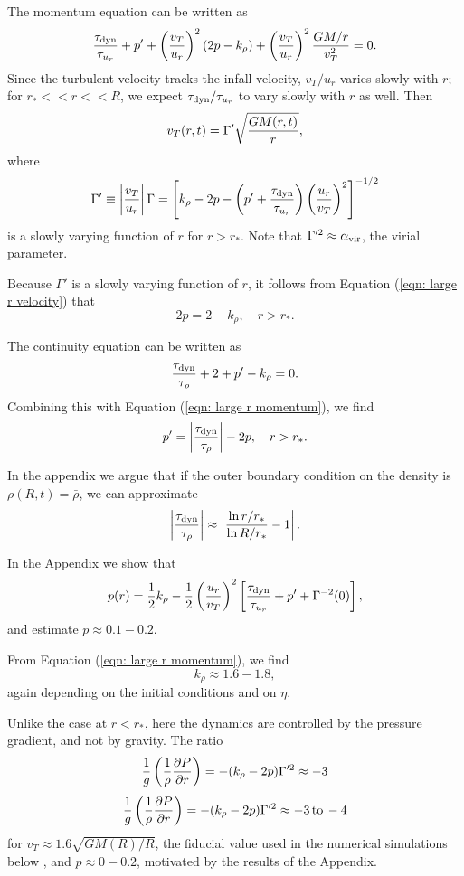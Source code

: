 \documentclass[iop,apj,numberedappendix]{emulateapj}
\newcommand       \phil[1]      {{\color{blue} #1}}
\newcommand       \be		{\begin{equation}}
\newcommand       \ee		{\end{equation}}
\newcommand       \etaeff       {\eta}
\newcommand       \tdyn         {\tau_{\rm dyn}}
\newcommand       \trho 	{{\tau_{\rho}}}
\newcommand       \tvr  	{{\tau_{u_r}}}
\begin{document}
The momentum equation can be written as
%
\be  %
{\tdyn\over\tau_{u_r}}+p'+\left({v_T\over u_r}\right)^2(2p-k_\rho)
+\left({v_T\over u_r}\right)^2{GM/r\over v_T^2}=0.
\ee  %
%
Since the turbulent velocity tracks the infall velocity, $v_T/u_r$
varies slowly with $r$; for $r_*<< r<<R$, we expect $\tdyn/\tau_{u_r}$
to vary slowly with $r$ as well. Then
% 
% 
\be  \label{eqn: large r velocity}%
v_T(r,t)=\Gamma'\sqrt{GM(r,t)\over r},
\ee  %
%
where 
%
\be  \label{eqn: Gprime}%
\Gamma'\equiv \left|{v_T\over u_r}\right|\Gamma
=\left[
k_\rho-2p-
\left(p'+{\tdyn\over \tvr}\right)
\left({u_r\over v_T}\right)^2
\right]^{-1/2}
\ee  %
%
is a slowly varying function of $r$ for $r>r_*$. Note that
$\Gamma^{\prime 2}\approx \alpha_{\rm vir}$, the virial parameter.

Because $\Gamma'$ is a slowly varying function of $r$, it follows from
Equation (\ref{eqn: large r velocity}) that 
% 
\be  \label{eqn: large r momentum} %
2p=2-k_\rho, \quad r>r_*.
\ee  %
%

The continuity equation can be written as
%
\be  %
{\tdyn\over \tau_\rho}+2+p'-k_\rho=0.
\ee  %
%
Combining this with Equation (\ref{eqn: large r momentum}), we
find
%
\be \label{eqn: large r p prime} %
p'=\left|{\tdyn\over\trho}\right| - 2p, \quad r>r_*.
\ee  %
%

In the appendix we argue that if the outer boundary condition on the
density is $\rho(R,t)=\bar\rho$, we can approximate
%
\be  \label{eqn: trho}%
\left|{\tdyn\over\trho}\right|\approx
\left|{\ln r/r_*\over\ln R/r_*}-1\right|.
\ee  %
%


In the Appendix we show that 
%
\be  %
p(r) = {1\over2}k_\rho -{1\over2}\left({u_r\over  v_T}\right)^2
\left[{\tdyn\over \tvr}+p'+\Gamma^{-2}(0)\right],
\ee  %
and estimate $p\approx0.1-0.2$.

From Equation (\ref{eqn: large r momentum}), we find
%
\be  %
k_\rho \approx1.6-1.8,
\ee  %
%
again depending on the initial conditions and on $\etaeff$.


Unlike the case at $r<r_*$, here the dynamics are controlled by the
pressure gradient, and not by gravity. The ratio
%
\be \label{eqn: pressure gradient ratio} %
{1\over g}\left({1\over\rho}{\partial P\over \partial r}\right)=-(k_\rho-2p)\Gamma'^2\approx-3
\ee  %
\phil{
\be \label{eqn: pressure gradient ratio} %
{1\over g}\left({1\over\rho}{\partial P\over \partial r}\right)=-(k_\rho-2p)\Gamma'^2\approx-3 \,{\rm to}\, -4
\ee  %
}
for $v_T\approx1.6 \sqrt{GM(R)/R}$, the fiducial value used in the
numerical simulations below\phil{, and $p \approx 0 - 0.2$, motivated by the results of the Appendix}.
%
%
\end{document}

